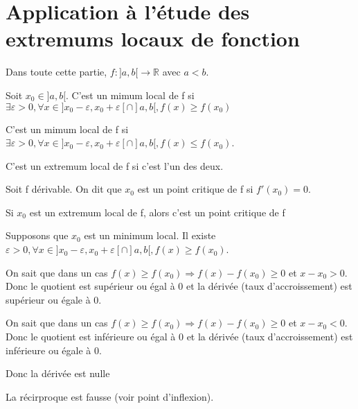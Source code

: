 \documentclass[french]{yLectureNote}
\newcommand{\R}[0]{\mathbb{R}}
\begin{document}
\section{Application à l'étude des extremums locaux de fonction}
Dans toute cette partie, $f : ]a,b[ \to \R$ avec $a<b$.

\begin{definition}
Soit \(x_0\in]a,b[\). C'est un mimum local de f si \(\exists \varepsilon>0,\forall x\in ]x_0-\varepsilon,x_0+\varepsilon[\cap ]a,b[, f(x)\geq f(x_0)\)

C'est un mimum local de f si \(\exists \varepsilon>0,\forall x\in ]x_0-\varepsilon,x_0+\varepsilon[\cap ]a,b[, f(x)\leq f(x_0)\).

C'est un extremum local de f si c'est l'un des deux.
\end{definition}
\begin{definition}
Soit f dérivable. On dit que \(x_0\) est un point critique de f si \(f'(x_0)=0\).
\end{definition}
\begin{proposition}
Si \(x_0\) est un extremum local de f, alors c'est un point critique de f
\end{proposition}
\begin{myproof}
Supposons que $x_0$ est un minimum local. Il existe $\varepsilon>0, \forall x\in  ]x_0-\varepsilon,x_0+\varepsilon[\cap ]a,b[, f(x)\geq f(x_0)$.

On sait que dans un cas \(f(x)\geq f(x_0) \Rightarrow f(x)-f(x_0)\geq 0\) et \(x-x_0>0\). Donc le quotient est supérieur ou égal à 0 et la dérivée (taux d'accroissement) est supérieur ou égale à 0.

On sait que dans un cas \(f(x)\geq f(x_0) \Rightarrow f(x)-f(x_0)\geq 0\) et \(x-x_0<0\). Donc le quotient est inférieure ou égal à 0 et la dérivée (taux d'accroissement) est inférieure ou égale à 0.

Donc la dérivée est nulle
\end{myproof}
La récirproque est fausse (voir point d'inflexion).
\end{document}
